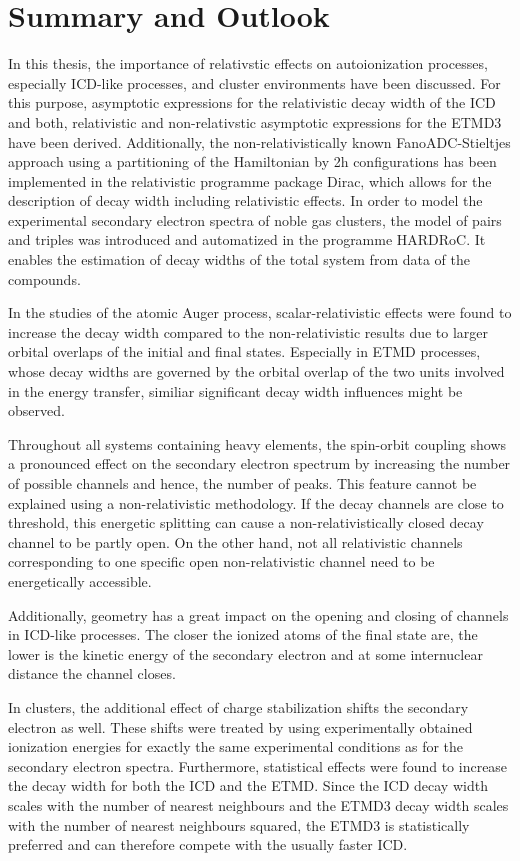 \chapter{Summary and Outlook}

In this thesis, the importance of relativstic effects on autoionization
processes, especially \ac{ICD}-like
processes, and cluster environments have been discussed.
For this purpose, asymptotic expressions for the relativistic decay width of the ICD
and both, relativistic and non-relativstic asymptotic expressions for the ETMD3
have been derived. Additionally, the non-relativistically known
FanoADC-Stieltjes approach
using a partitioning of the Hamiltonian by 2h configurations has been implemented
in the relativistic programme package Dirac,
which allows for the
description of decay width including relativistic effects.
In order to model the experimental secondary electron spectra of noble gas
clusters, the model of pairs and triples was introduced and automatized in the
programme HARDRoC. It enables the estimation of
decay widths of the total system from data of the compounds.

In the studies of the atomic Auger process, scalar-relativistic effects were
found to increase the decay width compared to the non-relativistic results
due to larger orbital overlaps of the initial and final states. Especially
in ETMD processes, whose decay widths are governed by the orbital overlap
of the two units involved in the energy transfer, similiar significant
decay width influences might be observed.

Throughout all systems containing heavy elements, the spin-orbit coupling
shows a pronounced effect on the secondary electron spectrum by increasing the
number of possible channels and hence, the number of peaks. This feature cannot
be explained using a non-relativistic methodology.
If the decay channels are close to threshold, this energetic splitting
can cause a non-relativistically closed decay channel to be partly open. On
the other hand, not all relativistic channels corresponding to one specific
open non-relativistic channel need to be energetically accessible.

Additionally, geometry has a great impact on the opening and closing of channels
in \ac{ICD}-like processes. The closer the ionized atoms of the final state are,
the lower is the kinetic energy of the secondary electron and at some
internuclear distance the channel closes.

In clusters, the additional effect of charge stabilization shifts the secondary
electron as well. These shifts were treated by using experimentally obtained
ionization energies for exactly the same experimental conditions as for the
secondary electron spectra.
Furthermore, statistical effects were found to increase the decay width
for both the ICD and the ETMD. Since the ICD decay width scales with the number
of nearest neighbours and the ETMD3 decay width scales with the number of nearest
neighbours squared, the ETMD3 is statistically preferred and can therefore compete
with the usually faster ICD.

